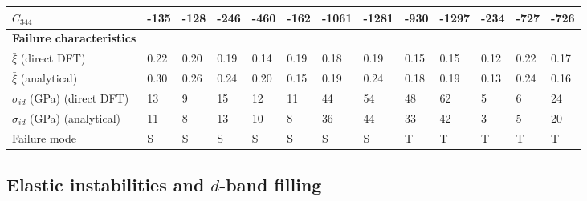 \documentclass[showpacs,aps,floatfix,prb,reprint,superscriptaddress]{revtex4-1}
\begin{document}
\begin{table*}
\begin{ruledtabular}
\begin{tabular}{l l l l l l l l l l l l l}
$C_{344}$ & -135 & -128   & -246  & -460  & -162  & -1061 & -1281 & -930 & -1297 & -234 & -727 & -726 \\
\hline
\textbf{Failure characteristics} & & & & & & & & & & & & \\
$\bar{\xi}$ (direct DFT) & 0.22 & 0.20 & 0.19 & 0.14 & 0.19 & 0.18 & 0.19 & 0.15 & 0.15 &  0.12 & 0.22 & 0.17 \\
$\bar{\xi}$ (analytical) & 0.30 & 0.26 & 0.24 & 0.20 & 0.15 & 0.19 & 0.24 & 0.18 & 0.19 &  0.13 & 0.24 & 0.16 \\
$\sigma_{id}$ (GPa) (direct DFT) & 13 & 9 & 15 & 12 & 11 & 44 & 54 & 48 & 62 & 5 & 6 & 24 \\
$\sigma_{id}$ (GPa) (analytical) & 11 & 8 & 13 & 10 & 8  & 36 & 44 & 33 & 42 & 3 & 5 & 20 \\
Failure mode & S & S & S & S & S & S & S & T & T & T & T & T \\
\end{tabular}
\end{ruledtabular}
\end{table*}

\subsection{Elastic instabilities and $d$-band filling}

\end{document}
